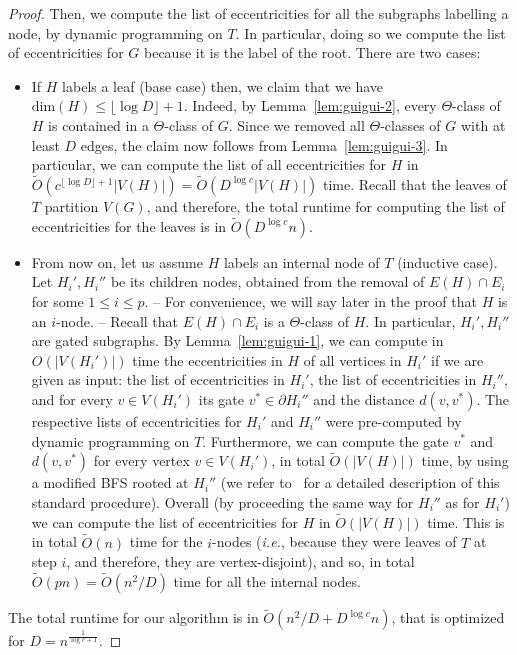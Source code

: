 \documentclass{article}
\begin{document}
\begin{proof}
Then, we compute the list of eccentricities for all the subgraphs labelling a node, by dynamic programming on $T$. 
In particular, doing so we compute the list of eccentricities for $G$ because it is the label of the root.
There are two cases:
\begin{itemize}
    \item If $H$ labels a leaf (base case) then, we claim that we have $\mbox{dim}(H) \leq \lfloor \log{D} \rfloor + 1$.
Indeed, by Lemma~\ref{lem:guigui-2}, every $\Theta$-class of $H$ is contained in a $\Theta$-class of $G$.
Since we removed all $\Theta$-classes of $G$ with at least $D$ edges, the claim now follows from Lemma~\ref{lem:guigui-3}.
In particular, we can compute the list of all eccentricities for $H$ in $\tilde{O}(c^{\lfloor \log{D} \rfloor + 1}|V(H)|) = \tilde{O}(D^{\log{c}}|V(H)|)$ time.
Recall that the leaves of $T$ partition $V(G)$, and therefore, the total runtime for computing the list of eccentricities for the leaves is in $\tilde{O}(D^{\log{c}}n)$.
    \item From now on, let us assume $H$ labels an internal node of $T$ (inductive case).
Let $H_i',H_i''$ be its children nodes, obtained from the removal of $E(H) \cap E_i$ for some $1 \leq i \leq p$.
-- For convenience, we will say later in the proof that $H$ is an $i$-node. --
Recall that $E(H) \cap E_i$ is a $\Theta$-class of $H$.
In particular, $H_i',H_i''$ are gated subgraphs.
By Lemma~\ref{lem:guigui-1}, we can compute in ${O}(|V(H_i')|)$ time the eccentricities in $H$ of all vertices in $H_i'$ if we are given as input: the list of eccentricities in $H_i'$, the list of eccentricities in $H_i''$, and for every $v \in V(H_i')$ its gate $v^* \in \partial H_i''$ and the distance $d(v,v^*)$. 
The respective lists of eccentricities for $H_i'$ and $H_i''$ were pre-computed by dynamic programming on $T$.
Furthermore, we can compute the gate $v^*$ and $d(v,v^*)$ for every vertex $v \in V(H_i')$, in total $\tilde{O}(|V(H)|)$ time, by using a modified BFS rooted at $H_i''$ (we refer to~\cite[Lemma 17]{ChLaRa19} for a detailed description of this standard procedure).
Overall (by proceeding the same way for $H_i''$ as for $H_i'$) we can compute the list of eccentricities for $H$ in $\tilde{O}(|V(H)|)$ time.
This is in total $\tilde{O}(n)$ time for the $i$-nodes ({\it i.e.}, because they were leaves of $T$ at step $i$, and therefore, they are vertex-disjoint), and so, in total $\tilde{O}(pn) = \tilde{ O}(n^2/D)$ time for all the internal nodes.
\end{itemize}
The total runtime for our algorithm is in $\tilde{O}(n^2/D + D^{\log{c}}n)$, that is optimized for $D = n^{\frac 1 {\log{c}+1}}$.
\end{proof}
\end{document}
